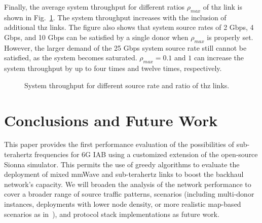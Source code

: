 Finally, the average system throughput for different ratios $\rho_{max}$ of \gls{thz} link is shown in Fig.~\ref{fig:THZtotal}.
The system throughput increases with the inclusion of additional \gls{thz} links. 
The figure also shows that system source rates of 2 Gbps, 4 Gbps, and 10 Gbps can be satisfied by a single donor when $\rho_{max}$ is properly set.
%
However, the larger demand of the 25 Gbps system source rate still cannot be satisfied, as the system becomes saturated.
$\rho_{max} = 0.1$ and $1$ can increase the system throughput by up to four times and twelve times, respectively.

\begin{figure}
    \centering
    \setlength{}
    \setlength{}
    
    \caption{System throughput for different source rate and ratio of \gls{thz} links.}
    \label{fig:THZtotal}
\end{figure}


\section{Conclusions and Future Work}
\label{sec:concl}
This paper provides the first performance evaluation of the possibilities of sub-terahertz frequencies for 6G IAB using a customized extension of the open-source Sionna simulator. This permits the use of greedy algorithms to evaluate the deployment of mixed mmWave and sub-terahertz links to boost the backhaul network's capacity.
We will broaden the analysis of the network performance to cover a broader range of source traffic patterns, scenarios (including multi-donor instances, deployments with lower node density, or more realistic map-based scenarios as in~\cite{gemmi2023on,gemmi2022on}), and protocol stack implementations as future work.



% 
% 

% 